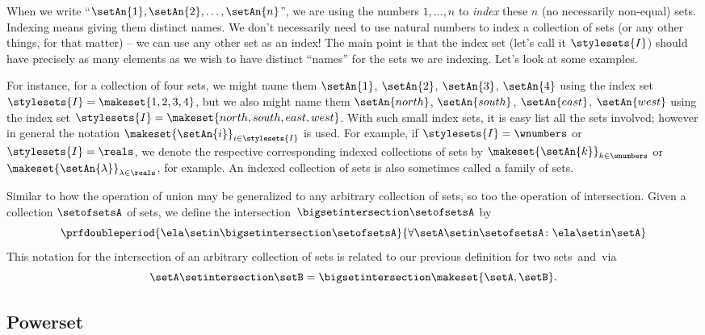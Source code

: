 \begin{remark}
When we write ``$\setAn{1}, \setAn{2}, \dots, \setAn{n}$'', we are using the numbers $1, \dots, n$ to \emph{index} these $n$ (no necessarily non-equal) sets. Indexing means giving them distinct names. We don't necessarily need to use natural numbers to index a collection of sets (or any other things, for that matter) -- we can use any other set as an index! The main point is that the index set (let's call it $\stylesets{I}$) should have precisely as many elements as we wish to have distinct ``names'' for the sets we are indexing. Let's look at some examples. 

For instance, for a collection of four sets, we might name them $\setAn{1}$, $\setAn{2}$, $\setAn{3}$, $\setAn{4}$ using the index set $\stylesets{I} = \makeset{1,2, 3, 4}$, but we also might name them $\setAn{north}$, $\setAn{south}$, $\setAn{east}$, $\setAn{west}$ using the index set $\stylesets{I} = \makeset{north, south, east, west}$. With such small index sets, it is easy list all the sets involved; however in general the notation $\makeset{\setAn{i}}_{i \in \stylesets{I}}$ is used. For example, if $\stylesets{I} = \wnumbers$ or $\stylesets{I} = \reals$, we denote the respective corresponding indexed collections of sets by $\makeset{\setAn{k}}_{k \in \wnumbers}$ or $\makeset{\setAn{\lambda}}_{\lambda \in \reals}$, for example. An indexed collection of sets is also sometimes called a family of sets. 
\end{remark}

Similar to how the operation of union may be generalized to any arbitrary collection of sets, so too the operation of intersection. Given a collection $\setofsetsA$ of sets, we define the intersection~$\bigsetintersection \setofsetsA$ by
%
\begin{equation}
    \prfdoubleperiod{\ela \setin\bigsetintersection \setofsetsA}{\forall \setA \setin\setofsetsA \colon \ela \setin\setA}
\end{equation}
This notation for the intersection of an arbitrary collection of sets is related to our previous definition for two sets~\setA and~\setB via
\begin{equation} \setA \setintersection \setB = \bigsetintersection \makeset{ \setA, \setB }.
\end{equation}



\subsection{Powerset}
\label{sec:power-set}

